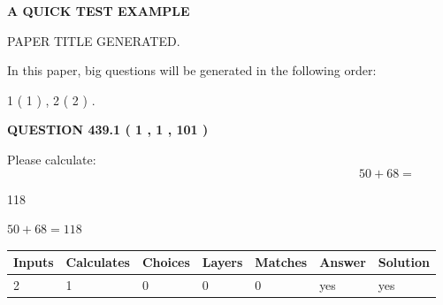 \documentclass[12pt]{article}
\begin{document}
   
 \vspace{0.2in}
{\LARGE {\textbf{ A QUICK TEST EXAMPLE}}}
   
   
 PAPER TITLE GENERATED.
   
   
   
\vspace{0.2in}
   
In this paper, big questions will be generated in the following order: 
   
   
   1 ( 1 )
 ,
   2 ( 2 )
 .
  
\vspace{0.2in}
  
{\textbf{\Large{QUESTION
439.1 
 ( 1 , 1 , 101 )
}}}
  
  
 
Please calculate:
\begin{equation}
50 +  %
68 = \nonumber
\end{equation}
 
 
 
\noindent{}
 
 

118
 
 
\noindent{}
 
 

 
 
 
\noindent{}
 
 

$ %
50 +  %
68=   %
118$
 
 
\noindent{}
 
 

 
   
   
   
   
\noindent\begin{tabular}{|l|l|l|l|l|l|l|}
 \hline
Inputs & Calculates & Choices & Layers & Matches & Answer & Solution \\ \hline
 2  & 
 1  & 
 0
  & 
 0  & 
 0  & 
  yes & 
  yes 
  \\ \hline
 \end{tabular}
   
   
   
   
\noindent{}
   
\end{document}
